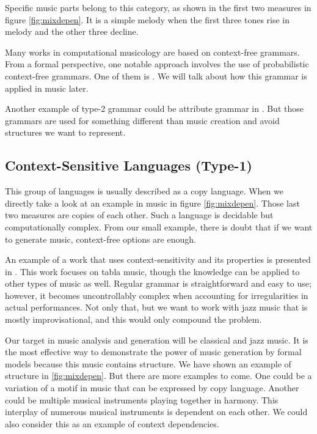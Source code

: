 Specific music parts belong to this category, as shown in the first two measures in figure \ref{fig:mixdepen}. It is a simple melody when the first three tones rise in melody and the other three decline.

Many works in computational musicology are based on context-free grammars. From a formal perspective, one notable approach involves the use of probabilistic context-free grammars. One of them is \cite{probmelodyreduction}. We will talk about how this grammar is applied in music later.

Another example of type-2 grammar could be attribute grammar in \cite{controlflow}. But those grammars are used for something different than music creation and avoid structures we want to represent.

\subsection*{Context-Sensitive Languages (Type-1)}
This group of languages is usually described as a copy language. When we directly take a look at an example in music in figure \ref{fig:mixdepen}. Those last two measures are copies of each other. Such a language is decidable but computationally complex. From our small example, there is doubt that if we want to generate music, context-free options are enough.

An example of a work that uses context-sensitivity and its properties is presented in \cite{belproc}. This work focuses on tabla music, though the knowledge can be applied to other types of music as well. Regular grammar is straightforward and easy to use; however, it becomes uncontrollably complex when accounting for irregularities in actual performances. Not only that, but we want to work with jazz music that is mostly improvisational, and this would only compound the problem.

Our target in music analysis and generation will be classical and jazz music. It is the most effective way to demonstrate the power of music generation by formal models because this music contains structure. We have shown an example of structure in \ref{fig:mixdepen}. But there are more examples to come. One could be a variation of a motif in music that can be expressed by copy language. Another could be multiple musical instruments playing together in harmony. This interplay of numerous musical instruments is dependent on each other. We could also consider this as an example of context dependencies.

